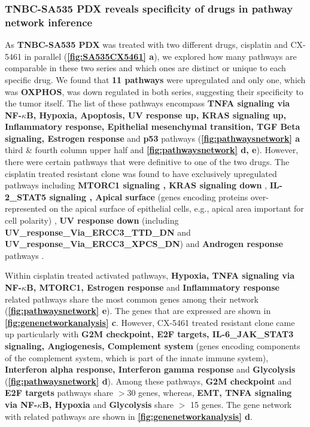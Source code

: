 \subsubsection{TNBC-SA535 PDX reveals specificity of drugs in pathway network inference} 
As \textbf{TNBC-SA535 PDX} was treated with two different drugs, cisplatin and CX-5461 in parallel (\textbf{\autoref{fig:SA535CX5461} a}), we explored how many pathways are comparable in these two series and which ones are distinct or unique to each specific drug. 
We found that \textbf{11 pathways} were upregulated and only one, which was \textbf{\ac{OXPHOS}}, was down regulated in both series, suggesting their specificity to the tumor itself. The list of these pathways encompass \textbf{TNFA signaling via NF-$\kappa$B, Hypoxia, Apoptosis, UV response up, KRAS signaling up, Inflammatory response, Epithelial mesenchymal transition, TGF Beta signaling, Estrogen response} and \textbf{p53} pathways ({\textbf{\autoref{fig:pathwaysnetwork} a} third \& fourth column upper half and \textbf{\autoref{fig:pathwaysnetwork} d, e}). However, there were certain pathways that were definitive to one of the two drugs. The cisplatin treated resistant clone was found to have exclusively upregulated pathways including \textbf{MTORC1 signaling \cite{peng2010role}, KRAS signaling down} \cite{tao2014oncogenic}, \textbf{IL-2\_STAT5 signaling \cite{wu2020activation, gutierrez2020role}, Apical surface} (genes encoding proteins over-represented on the apical surface of epithelial cells, e.g., apical area important for cell polarity) \cite{halaoui2015rewiring, wodarz2007cell}, \textbf{UV response down} (including \textbf{UV\_response\_Via\_ERCC3\_TTD\_DN}
and \textbf{UV\_response\_Via\_ERCC3\_XPCS\_DN}) and \textbf{Androgen response} pathways \cite{rampurwala2016role, michmerhuizen2020we}.}

Within cisplatin treated activated pathways, \textbf{Hypoxia, TNFA signaling via NF-$\kappa$B, MTORC1, Estrogen response} and \textbf{Inflammatory response} related pathways share the most common genes among their network (\textbf{\autoref{fig:pathwaysnetwork} e}). The genes that are expressed are shown in  \textbf{\autoref{fig:genenetworkanalysis} c}. However, CX-5461 treated resistant clone came up particularly with \textbf{G2M checkpoint, E2F targets, IL-6\_JAK\_STAT3 signaling, Angiogenesis, Complement system} (genes encoding components of the complement system, which is part of the innate immune system), \textbf{Interferon alpha response, Interferon gamma response} and \textbf{Glycolysis} (\textbf{\autoref{fig:pathwaysnetwork} d}). Among these pathways, \textbf{G2M checkpoint} and \textbf{E2F targets} pathways share $>$30 genes, whereas, \textbf{\ac{EMT}, TNFA signaling via NF-$\kappa$B, Hypoxia} and \textbf{Glycolysis} share $>$ 15 genes. The gene network with related pathways are shown in  \textbf{\autoref{fig:genenetworkanalysis} d}. 

